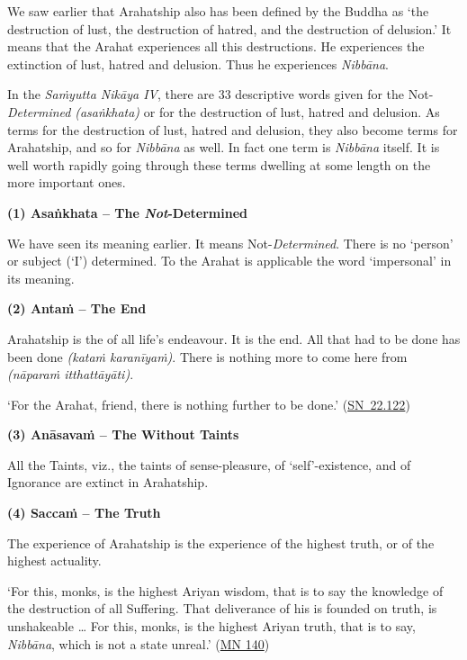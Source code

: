 We saw earlier that Arahatship also has been defined by the Buddha as `the destruction of lust, the destruction of hatred, and the destruction of delusion.' It means that the Arahat experiences all this destructions. He experiences the extinction of lust, hatred and delusion. Thus he experiences \emph{Nibbāna}.

In the \emph{Saṁyutta Nikāya IV}, there are 33 descriptive words given for the Not-\emph{Determined} \emph{(asaṅkhata)} or for the destruction of lust, hatred and delusion. As terms for the destruction of lust, hatred and delusion, they also become terms for Arahatship, and so for \emph{Nibbāna} as well. In fact one term is \emph{Nibbāna} itself. It is well worth rapidly going through these terms dwelling at some length on the more important ones.

\clearpage

\textbf{(1) Asaṅkhata -- The \emph{Not}-Determined}

We have seen its meaning earlier. It means Not-\emph{Determined}. There is no `person' or subject (`I') determined. To the Arahat  is applicable the word `impersonal' in its  meaning.

\textbf{(2) Antaṁ -- The End}

Arahatship is the  of all life's endeavour. It is the end. All that had to be done has been done \emph{(kataṁ karanīyaṁ)}. There is nothing more to come here from \emph{(nāparaṁ itthattāyāti)}.

`For the Arahat, friend, there is nothing further to be done.' (\href{https://suttacentral.net/sn22.122/en/suddhaso}{SN~22.122})

\textbf{(3) Anāsavaṁ -- The Without Taints}

All the Taints, viz., the taints of sense-pleasure, of `self'-existence, and of Ignorance are extinct in Arahatship.

\textbf{(4) Saccaṁ -- The Truth}

The experience of Arahatship is the experience of the highest truth, or of the highest actuality.

`For this, monks, is the highest Ariyan wisdom, that is to say the knowledge of the destruction of all Suffering. That deliverance of his is founded on truth, is unshakeable \ldots{} For this, monks, is the highest Ariyan truth, that is to say, \emph{Nibbāna}, which is not a state unreal.' (\href{https://suttacentral.net/mn140/en/bodhi}{MN 140})

